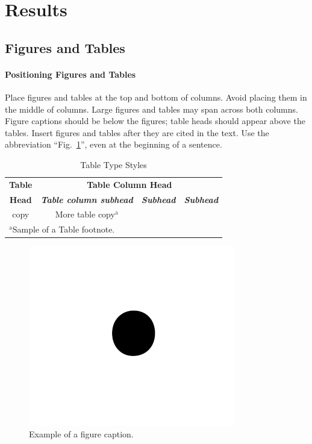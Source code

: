 \documentclass[conference]{IEEEtran}
\begin{document}
\section{Results}

\subsection{Figures and Tables}
\paragraph{Positioning Figures and Tables} Place figures and tables at the top and
bottom of columns. Avoid placing them in the middle of columns. Large
figures and tables may span across both columns. Figure captions should be
below the figures; table heads should appear above the tables. Insert
figures and tables after they are cited in the text. Use the abbreviation
``Fig.~\ref{fig}'', even at the beginning of a sentence.

\begin{table}[htbp]
\caption{Table Type Styles}
\begin{center}
\begin{tabular}{|c|c|c|c|}
\hline
\textbf{Table}&\multicolumn{3}{|c|}{\textbf{Table Column Head}} \\
\cline{2-4}
\textbf{Head} & \textbf{\textit{Table column subhead}}& \textbf{\textit{Subhead}}& \textbf{\textit{Subhead}} \\
\hline
copy& More table copy$^{\mathrm{a}}$& &  \\
\hline
\multicolumn{4}{l}{$^{\mathrm{a}}$Sample of a Table footnote.}
\end{tabular}
\label{tab1}
\end{center}
\end{table}

\begin{figure}[htbp]
\centerline{\includegraphics{fig1.png}}
\caption{Example of a figure caption.}
\label{fig}
\end{figure}
\end{document}
